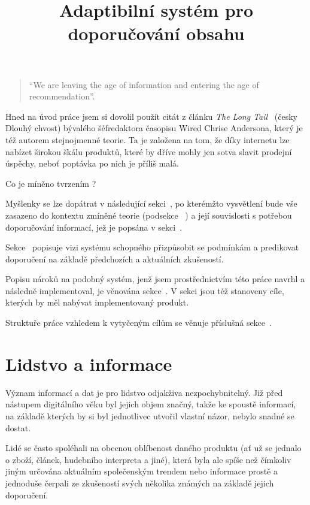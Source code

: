 \documentclass[thesis=M,czech]{FITthesis}[2014/05/07]
\title{Adaptibilní systém pro doporučování obsahu}
\begin{document}

\begin{introduction}
	\begin{quote}
		``We are leaving the age of information and entering the age of recommendation''.
	\end{quote}
	Hned na úvod práce jsem si dovolil použít citát z článku \emph{The Long Tail}~\cite{anderson} (česky Dlouhý chvost) bývalého šéfredaktora časopisu Wired Chrise Andersona, který je též autorem stejnojmenné teorie. Ta je založena na tom, že díky internetu lze nabízet širokou škálu produktů, které by dříve mohly jen sotva slavit prodejní úspěchy, neboť poptávka po nich je příliš malá. 
	
	Co je míněno tvrzením ?
	
	Myšlenky se lze dopátrat v následující sekci~, po kterémžto vysvětlení bude vše zasazeno do kontextu zmíněné teorie (podsekce ~) a její souvislosti s potřebou doporučování informací, jež je popsána v sekci~.
	
	Sekce~ popisuje vizi systému schopného přizpůsobit se podmínkám a predikovat doporučení na základě předchozích a aktuálních zkušeností.
	
	Popisu nároků na podobný systém, jenž jsem prostřednictvím této práce navrhl a následně implementoval, je věnována sekce~. V sekci jsou též stanoveny cíle, kterých by měl nabývat implementovaný produkt. 
	
	Struktuře práce vzhledem k vytyčeným cílům se věnuje příslušná sekce~.
	
\section{Lidstvo a informace}	
	\label{sub:lidinf}
	Význam informací a dat je pro lidstvo odjakživa nezpochybnitelný. Již před nástupem digitálního věku byl jejich objem značný, takže ke spoustě informací, na základě kterých by si byl jednotlivec utvořil vlastní názor, nebylo snadné se dostat.
	
	Lidé se často spoléhali na obecnou oblíbenost daného produktu (ať už se jednalo o zboží, článek, hudebního interpreta a jiné), která byla ale spíše než čímkoliv jiným určována aktuálním společenským trendem nebo informace prostě a jednoduše čerpali ze zkušeností svých několika známých na základě jejich doporučení.


\end{introduction}
\end{document}
